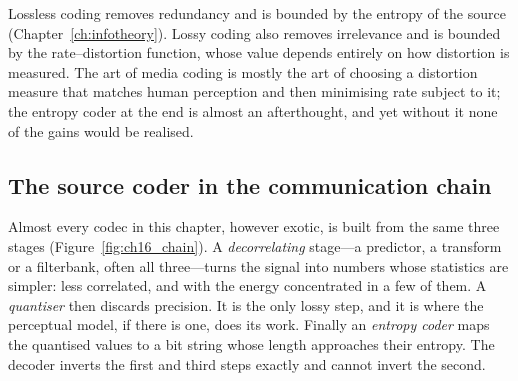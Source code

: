 \begin{keyidea}
Lossless coding removes redundancy and is bounded by the entropy of the source
(Chapter~\ref{ch:infotheory}). Lossy coding also removes irrelevance and is bounded by the
rate--distortion function, whose value depends entirely on how distortion is measured. The art of
media coding is mostly the art of choosing a distortion measure that matches human perception and
then minimising rate subject to it; the entropy coder at the end is almost an afterthought, and yet
without it none of the gains would be realised.
\end{keyidea}

\subsection{The source coder in the communication chain}

Almost every codec in this chapter, however exotic, is built from the same three stages
(Figure~\ref{fig:ch16_chain}). A \emph{decorrelating} stage---a predictor, a transform or a
filterbank, often all three---turns the signal into numbers whose statistics are simpler: less
correlated, and with the energy concentrated in a few of them. A \emph{quantiser} then discards
precision. It is the only lossy step, and it is where the perceptual model, if there is one, does
its work. Finally an \emph{entropy coder} maps the quantised values to a bit string whose length
approaches their entropy. The decoder inverts the first and third steps exactly and cannot invert
the second.

